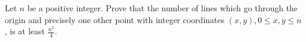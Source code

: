 Let $n$ be a positive integer. Prove that the number of lines which go through the origin and precisely one other point with integer coordinates $(x,y),0\le x,y\le n$,  is at least $\frac{n^2}{4}$.